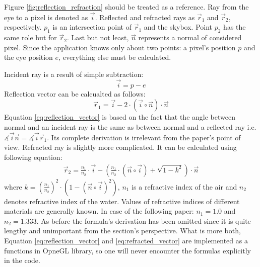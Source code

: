\documentclass{report}
\begin{document}
Figure \ref{fig:reflection_refraction} should be treated as a reference. Ray from the eye to a pixel is denoted as $\vec{i}$. Reflected and refracted rays as $\vec{r}_1$ and $\vec{r}_2$, respectively. $p_1$ is an intersection point of $\vec{r}_1$ and the skybox. Point $p_2$ has the same role but for $\vec{r}_2$. Last but not least, $\vec{n}$ represents a normal of considered pixel. Since the application knows only about two points: a pixel's position $p$ and the eye position $e$, everything else must be calculated. 

Incident ray is a result of simple subtraction:
\[
\vec{i} = p - e
\]
Reflection vector can be calcualted as follows:
\begin{equation} \label{eq:reflection_vector}
\vec{r}_1 = \vec{i} - 2 \cdot (\vec{i} \circ \vec{n}) \cdot \vec{n}
\end{equation} 
Equation \ref{eq:reflection_vector} is based on the fact that the angle between normal and an incident ray is the same as between normal and a reflected ray i.e. $\measuredangle{\vec{i}\vec{n}} = \measuredangle{\vec{i}\vec{r}_1}$. Its complete derivation is irrelevant from the paper's point of view.
Refracted ray is slightly more complicated. It can be calculated using following equation:
\begin{equation}\label{eq:refracted_vector}
\begin{split}
\vec{r}_2 = \frac{n_1}{n_2} \cdot \vec{i} - (\frac{n_1}{n_2} \cdot (\vec{n} \circ \vec{i}) + \sqrt{1 - k^{2}}) \cdot \vec{n}
\end{split}
\end{equation}
where $k = (\frac{n_1}{n_2})^{2} \cdot (1 - (\vec{n} \circ \vec{i})^{2})$, $n_1$ is a refractive index of the air and $n_2$ denotes refractive index of the water. Values of refractive indices of different materials are generally known. In case of the following paper: $n_1 = 1.0$ and $n_2 =1.333$. As before the formula's derivation has been omitted since it is quite lengthy and unimportant from the section's perspective. What is more both, Equation \ref{eq:reflection_vector} and \ref{eq:refracted_vector} are implemented as a functions in OpneGL library, so one will never encounter the formulas explicitly in the code.
\end{document}
